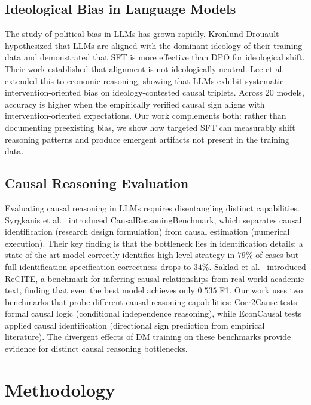 \documentclass[11pt]{article}
\begin{document}
\subsection{Ideological Bias in Language Models}

The study of political bias in LLMs has grown rapidly. Kronlund-Drouault~\cite{kronlund2024propaganda} hypothesized that LLMs are aligned with the dominant ideology of their training data and demonstrated that SFT is more effective than DPO for ideological shift. Their work established that alignment is not ideologically neutral. Lee et al.~\cite{lee2026ideological} extended this to economic reasoning, showing that LLMs exhibit systematic intervention-oriented bias on ideology-contested causal triplets. Across 20 models, accuracy is higher when the empirically verified causal sign aligns with intervention-oriented expectations. Our work complements both: rather than documenting preexisting bias, we show how targeted SFT can measurably shift reasoning patterns and produce emergent artifacts not present in the training data.

\subsection{Causal Reasoning Evaluation}

Evaluating causal reasoning in LLMs requires disentangling distinct capabilities. Syrgkanis et al.~\cite{syrgkanis2026causalreasoning} introduced CausalReasoningBenchmark, which separates causal identification (research design formulation) from causal estimation (numerical execution). Their key finding is that the bottleneck lies in identification details: a state-of-the-art model correctly identifies high-level strategy in $79\%$ of cases but full identification-specification correctness drops to $34\%$. Saklad et al.~\cite{saklad2025recite} introduced ReCITE, a benchmark for inferring causal relationships from real-world academic text, finding that even the best model achieves only $0.535$ F1. Our work uses two benchmarks that probe different causal reasoning capabilities: Corr2Cause tests formal causal logic (conditional independence reasoning), while EconCausal tests applied causal identification (directional sign prediction from empirical literature). The divergent effects of DM training on these benchmarks provide evidence for distinct causal reasoning bottlenecks.

\section{Methodology}
\end{document}
